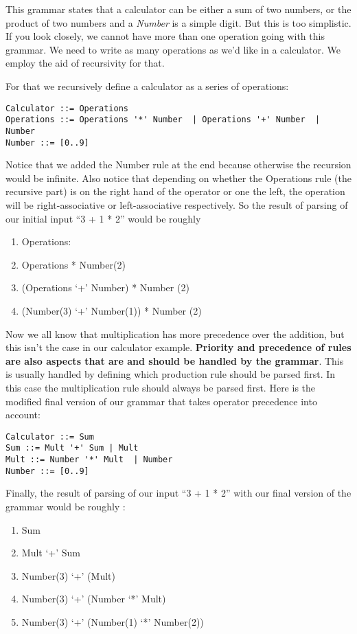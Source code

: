 \documentclass[12pt]{article}
\begin{document}
This grammar states that a calculator can be either a sum of two numbers, or the product of two numbers and a \emph{Number} is a simple digit. But this is too simplistic. If you look closely, we cannot have more than one operation going with this grammar. We need to write as many operations as we’d like in a calculator. We employ the aid of recursivity for that.

For that we recursively define a calculator as a series of operations:

\begin{lstlisting}
Calculator ::= Operations
Operations ::= Operations '*' Number  | Operations '+' Number  | Number
Number ::= [0..9]  
\end{lstlisting}

Notice that we added the Number rule at the end because otherwise the recursion would be infinite. Also notice that depending on whether the Operations rule (the recursive part) is on the right hand of the operator or one the left, the operation will be right-associative or left-associative respectively.
So the result of parsing of our initial input “3 + 1 * 2” would be roughly
\begin{enumerate}
    \item Operations:
    \item Operations * Number(2)
    \item (Operations ‘+’ Number) * Number (2)
    \item (Number(3) ‘+’ Number(1))  * Number (2)
\end{enumerate}

Now we all know that multiplication has more precedence over the addition, but this isn’t the case in our calculator example. \textbf{Priority and precedence of rules are also aspects that are and should be handled by the grammar}. This is usually handled by defining which production rule should be parsed first. In this case the multiplication rule should always be parsed first. Here is the modified final version of our grammar that takes operator precedence into account:

\begin{lstlisting}
Calculator ::= Sum
Sum ::= Mult '+' Sum | Mult
Mult ::= Number '*' Mult  | Number
Number ::= [0..9]
\end{lstlisting}

Finally, the result of parsing of our input “3 + 1 * 2”  with our final version of the grammar would be roughly :
\begin{enumerate}
    \item Sum
    \item Mult ‘+’ Sum
    \item Number(3) ‘+’ (Mult)
    \item Number(3) ‘+’ (Number ‘*’ Mult)
    \item Number(3) ‘+’ (Number(1) ‘*’ Number(2))
\end{enumerate}
\end{document}
